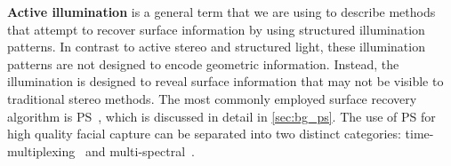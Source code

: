 \textbf{Active illumination} is a general term that we are using to describe
methods that attempt to recover surface information by using structured
illumination patterns. In contrast to active stereo and structured
light, these illumination patterns are not designed to encode geometric
information. Instead, the illumination is designed to reveal surface information
that may not be visible to traditional stereo methods.
The most commonly employed surface recovery
algorithm is PS~\cite{woodham1980photometric}, which is discussed in detail in
\cref{sec:bg_ps}. The use of PS for high quality facial capture
can be separated into two distinct categories: time-multiplexing~\cite{ma2007rapid,%
fyffe2011comprehensive,alexander2009digital,vonderPahlen:2014kg,%
malzbender2006surface,wilson2010temporal,ghosh2011multiview} and
multi-spectral~\cite{vogiatzis2012self,brostow2011video,fyffe2011single}.

